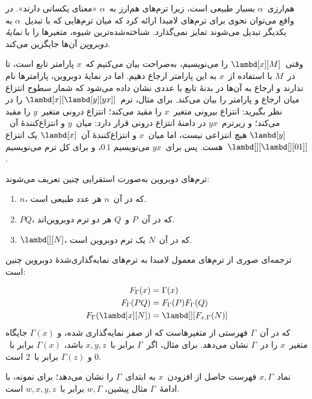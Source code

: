 \documentclass[../../../include/open-logic-section]{subfiles}
\begin{document}


هم‌ارزی~$\alpha$ بسیار طبیعی است، زیرا ترم‌های هم‌ارز به~$\alpha$
«معنای یکسانی دارند». در واقع می‌توان نحوی برای ترم‌های لامبدا ارائه کرد
که میان ترم‌هایی که با تبدیل~$\alpha$ به یکدیگر تبدیل می‌شوند تمایز
نمی‌گذارد. شناخته‌شده‌ترین شیوه، متغیرها را با \emph{نمایهٔ دوبروین}
آن‌ها جایگزین می‌کند.

وقتی~$\lambd[x][M]$ را می‌نویسیم، به‌صراحت بیان می‌کنیم که~$x$ پارامتر
تابع است، تا در~$M$ با استفاده از~$x$ به این پارامتر ارجاع دهیم. اما در
نمایهٔ دوبروین، پارامترها نام ندارند و ارجاع به آن‌ها در بدنهٔ تابع با
عددی نشان داده می‌شود که شمار سطوح انتزاع میان ارجاع و پارامتر را بیان
می‌کند. برای مثال، ترم~$\lambd[x][\lambd[y][y x]]$ را در نظر بگیرید:
انتزاع بیرونی متغیر~$x$ را مقید می‌کند؛ انتزاع درونی متغیر~$y$ را مقید
می‌کند؛ و زیرترم~$y x$ در دامنهٔ انتزاع درونی قرار دارد: میان~$y$ و
انتزاع‌کنندهٔ آن~$\lambd[y]$ هیچ انتزاعی نیست، اما میان~$x$ و
انتزاع‌کنندهٔ آن~$\lambd[x]$ یک انتزاع هست. پس برای~$y x$ می‌نویسیم
$0\, 1$، و برای کل ترم می‌نویسیم~$\lambd[][\lambd[][01]]$.

\begin{defn}
  ترم‌های دوبروین به‌صورت استقرایی چنین تعریف می‌شوند:
  \begin{enumerate}
  \item $n$، که در آن~$n$ هر عدد طبیعی است.
  \item $PQ$، که در آن~$P$ و~$Q$ هر دو ترم دوبروین‌اند.
  \item $\lambd[][N]$، که در آن~$N$ یک ترم دوبروین است.
  \end{enumerate}
\end{defn}

ترجمه‌ای صوری از ترم‌های معمول لامبدا به ترم‌های نمایه‌گذاری‌شدهٔ
دوبروین چنین است:
\begin{defn}
  \begin{align*}
    F_\Gamma(x) &= \Gamma(x) \\
    F_\Gamma(PQ) &= F_\Gamma(P)F_\Gamma(Q) \\
    F_\Gamma(\lambd[x][N]) &= \lambd[][F_{x,\Gamma}(N)]
  \end{align*}
  که در آن~$\Gamma$ فهرستی از متغیرهاست که از صفر نمایه‌گذاری شده، و
  $\Gamma(x)$ جایگاه متغیر~$x$ را در~$\Gamma$ نشان می‌دهد. برای مثال،
  اگر~$\Gamma$ برابر با~$x,y,z$ باشد، $\Gamma(x)$ برابر با~$0$ و
  $\Gamma(z)$ برابر با~$2$ است.
  
  نماد~$x,\Gamma$ فهرست حاصل از افزودن~$x$ به ابتدای~$\Gamma$ را نشان
  می‌دهد؛ برای نمونه، با ادامهٔ~$\Gamma$ مثال پیشین، $w,\Gamma$ برابر
  با~$w,x,y,z$ است.
\end{defn}
\end{document}
